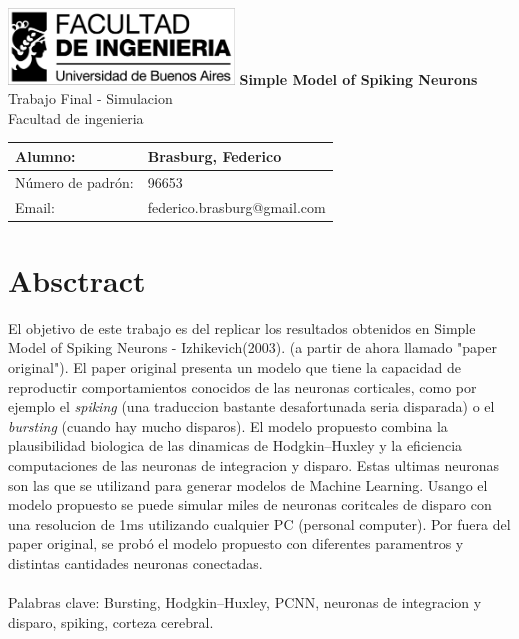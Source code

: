 \documentclass[12pt]{article}
\begin{document}
\begin{titlepage} %
	\hfill\includegraphics[width=6cm]{images/logofiuba.jpg}
    \centering
    \vfill
    \Huge \textbf{Simple Model of Spiking Neurons}
    \vskip2cm
    \Large Trabajo Final - Simulacion \\
    Facultad de ingenieria\\ %
    \vskip2cm
    \begin{tabular}{ | l | l | } %
      \hline
      Alumno: & Brasburg, Federico \\ \hline
      Número de padrón: & 96653 \\ \hline
      Email: & federico.brasburg@gmail.com \\ \hline
    \end{tabular}
    \vskip2cm
    \vfill
    \vfill
\end{titlepage}

\tableofcontents %
\newpage

\section{Absctract}\label{sec:intro}
El objetivo de este trabajo es del replicar los resultados obtenidos en Simple Model of Spiking Neurons - Izhikevich(2003). \cite{paperOriginal} (a partir de ahora llamado "paper original").
El paper original presenta un modelo que tiene la capacidad de reproductir comportamientos conocidos de las neuronas corticales, como por ejemplo el \textit{spiking} (una traduccion bastante desafortunada seria disparada)
o el \textit{bursting} (cuando hay mucho disparos). El modelo propuesto combina la plausibilidad biologica de las dinamicas de Hodgkin–Huxley \cite{HodgkinHuxley} y la eficiencia computaciones de las neuronas de integracion y disparo.
Estas ultimas neuronas son las que se utilizand para generar modelos de Machine Learning. Usango el modelo propuesto se puede simular miles de neuronas coritcales de disparo con una resolucion de 1ms utilizando cualquier PC (personal computer).
Por fuera del paper original, se probó el modelo propuesto con diferentes paramentros y distintas cantidades neuronas conectadas.
\\ \\
Palabras clave: Bursting, Hodgkin–Huxley, PCNN, neuronas de integracion y disparo, spiking, corteza cerebral.
\end{document}
